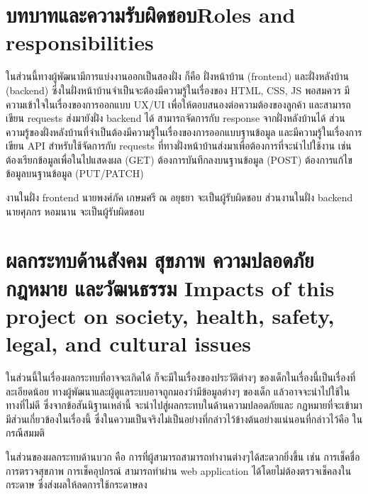 \section{\ifcpe บทบาทและความรับผิดชอบ\else Roles and responsibilities\fi}
ในส่วนนี้ทางผู้พัฒนามีการแบ่งงานออกเป็นสองฝั่ง ก็คือ ฝั่งหน้าบ้าน 
(frontend) และฝั่งหลังบ้าน (backend) ซึ่งในฝั่งหน้าบ้านจำเป็นจะต้องมีความรู้ในเรื่องของ HTML, CSS, JS พอสมควร มีความเข้าใจในเรื่องของการออกแบบ UX/UI เพื่อให้ตอบสนองต่อความต้องของลูกค้า และสามารถเขียน requests ส่งมายังฝั่ง backend ได้ สามารถจัดการกับ response จากฝั่งหลังบ้านได้ ส่วนความรู้ของฝั่งหลังบ้านที่จำเป็นต้องมีความรู้ในเรื่องของการออกแบบฐานข้อมูล  และมีความรู้ในเรื่องการเขียน API  สำหรับใช้จัดการกับ requests ที่ทางฝั่งหน้าบ้านส่งมาเพื่อต้องการที่จะนำไปใช้งาน เช่น ต้องเรียกข้อมูลเพื่อในไปแสดงผล (GET)
ต้องการบันทึกลงบนฐานข้อมูล (POST) ต้องการแก้ไขข้อมูลบนฐานข้อมูล (PUT/PATCH)

งานในฝั่ง frontend นายพงศ์ภัค เกษมศรี ณ อยุธยา จะเป็นผู้รับผิดชอบ 
ส่วนงานในฝั่ง backend นายศุภกร หอมนาน  จะเป็นผู้รับผิดชอบ


\section{\ifcpe%
ผลกระทบด้านสังคม สุขภาพ ความปลอดภัย กฎหมาย และวัฒนธรรม
\else%
Impacts of this project on society, health, safety, legal, and cultural issues
\fi}

ในส่วนนี้ในเรื่องผลกระทบที่อาจจะเกิดได้ ก็จะมีในเรื่องของประวัติต่างๆ ของเด็กในเรื่องนี้เป็นเรื่องที่ละเอียดน้อย ทางผู้พัฒนาและผู้ดูแลระบบอาจถูกมองว่ามีข้อมูลต่างๆ ของเด็ก แล้วอาจจะนำไปใช้ในทางที่ไม่ดี  ซึ่งจากข้อสันนิฐานเหล่านี้ จะนำไปสู่ผลกระทบในด้านความปลอดภัยและ กฏหมายที่จะเข้ามามีส่วนเกี่ยวข้องในเรื่องนี้ ซึ่งในความเป็นจริงไม่เป็นอย่างที่กล่าวไว้ข้างต้นอย่างแน่นอนที่กล่าวไว้คือ ในกรณีสมมติ

ในส่วนของผลกระทบด้านบวก คือ การที่ผู้สามารถสามารถทำงานต่างๆได้สะดวกยิ่งขึ้น เช่น การเช็คชื่อ การตรวจสุขภาพ การเช็คอุปกรณ์ สามารถทำผ่าน web application ได้โดยไม่ต้องตรวจเช็คลงในกระดาษ ซึ่งส่งผลให้ลดการใช้กระดาษลง

